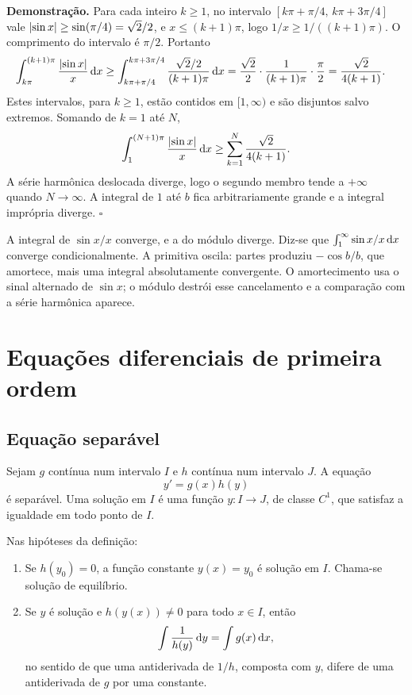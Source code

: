 \documentclass[11pt,a4paper]{article}
\begin{document}
\noindent\textbf{Demonstração.}
Para cada inteiro \(k\ge 1\), no intervalo \([k\pi+\pi/4,\,k\pi+3\pi/4]\) vale \(\left\lvert \sin x \right\rvert\ge\sin(\pi/4)=\sqrt{2}/2\), e \(x\le (k+1)\pi\), logo \(1/x\ge 1/((k+1)\pi)\). O comprimento do intervalo é \(\pi/2\). Portanto
\begin{align*}
\int_{k\pi}^{(k+1)\pi}\frac{\left\lvert \sin x \right\rvert}{x}\,\mathrm{d} x
&\ge\int_{k\pi+\pi/4}^{k\pi+3\pi/4}\frac{\sqrt{2}/2}{(k+1)\pi}\,\mathrm{d} x
=\frac{\sqrt{2}}{2}\cdot\frac{1}{(k+1)\pi}\cdot\frac{\pi}{2}
=\frac{\sqrt{2}}{4(k+1)}.
\end{align*}
Estes intervalos, para \(k\ge 1\), estão contidos em \([1,\infty)\) e são disjuntos salvo extremos. Somando de \(k=1\) até \(N\),
\[
\int_1^{(N+1)\pi}\frac{\left\lvert \sin x \right\rvert}{x}\,\mathrm{d} x
\ge\sum_{k=1}^{N}\frac{\sqrt{2}}{4(k+1)}.
\]
A série harmônica deslocada diverge, logo o segundo membro tende a \(+\infty\) quando \(N\to\infty\). A integral de \(1\) até \(b\) fica arbitrariamente grande e a integral imprópria diverge.
\hfill\(\square\)

\begin{observacao}
A integral de \(\sin x/x\) converge, e a do módulo diverge. Diz-se que \(\int_1^{\infty}\sin x/x\,\mathrm{d} x\) converge condicionalmente. A primitiva oscila: partes produziu \(-\cos b/b\), que amortece, mais uma integral absolutamente convergente. O amortecimento usa o sinal alternado de \(\sin x\); o módulo destrói esse cancelamento e a comparação com a série harmônica aparece.
\end{observacao}

\section{Equações diferenciais de primeira ordem}

\subsection{Equação separável}

\begin{definicao}
Sejam \(g\) contínua num intervalo \(I\) e \(h\) contínua num intervalo \(J\). A equação
\[
y'=g(x)h(y)
\]
é separável. Uma solução em \(I\) é uma função \(y:I\to J\), de classe \(C^1\), que satisfaz a igualdade em todo ponto de \(I\).
\end{definicao}

\begin{teorema}
Nas hipóteses da definição:
\begin{enumerate}
\item Se \(h(y_{0})=0\), a função constante \(y(x)=y_{0}\) é solução em \(I\). Chama-se solução de equilíbrio.
\item Se \(y\) é solução e \(h(y(x))\neq 0\) para todo \(x\in I\), então
\[
\int\frac{1}{h(y)}\,\mathrm{d} y=\int g(x)\,\mathrm{d} x,
\]
no sentido de que uma antiderivada de \(1/h\), composta com \(y\), difere de uma antiderivada de \(g\) por uma constante.
\end{enumerate}
\end{teorema}
\end{document}
